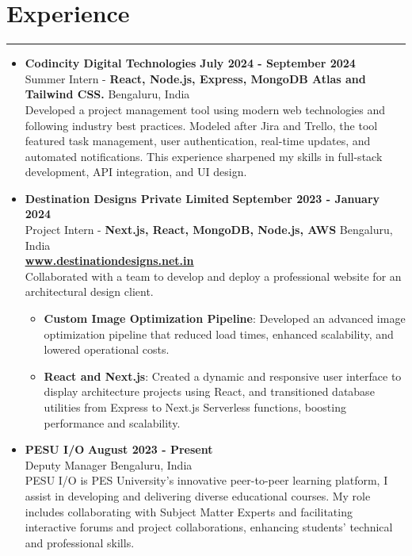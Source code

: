 \documentclass[a4paper,10.5pt]{article}
\begin{document}
\section*{Experience}
\vspace{-.3em}
\hrule
\vspace{0.4em}
\begin{itemize}
    \item \textbf{Codincity Digital Technologies} \hfill \textbf{July 2024 - September 2024} \vspace{0.3em} \\ 
    Summer Intern - \textbf{React, Node.js, Express, MongoDB Atlas and Tailwind CSS.} \vspace{0.3em} \hfill Bengaluru, India \\
    Developed a project management tool using modern web technologies and following industry best practices. Modeled after Jira and Trello, the tool featured task management, user authentication, real-time updates, and automated notifications. This experience sharpened my skills in full-stack development, API integration, and UI design.
          
    \item \vspace{0.3em} \textbf{Destination Designs Private Limited} \hfill \textbf{September 2023 - January 2024} \vspace{0.3em} \\
          Project Intern - \textbf{Next.js, React, MongoDB, Node.js, AWS} \hfill Bengaluru, India \\ \textbf{\href{https://www.destinationdesigns.net.in/}
          {\underline{www.destinationdesigns.net.in}}}  \vspace{0.3em} \\ Collaborated with a team to develop and deploy a professional website for an architectural design client. 
	      \begin{itemize}
		      \item \textbf{Custom Image Optimization Pipeline}: Developed an advanced image optimization pipeline that reduced load times, enhanced scalability, and lowered operational costs.
		      \item \textbf{React and Next.js}: Created a dynamic and responsive user interface to display architecture projects using React, and transitioned database utilities from Express to Next.js Serverless functions, boosting performance and scalability.
	      \end{itemize}
    \item \vspace{0.3em} \textbf{PESU I/O} \hfill \textbf{August 2023 - Present} \\ 
    Deputy Manager \hfill Bengaluru, India \vspace{0.3em} \\
    PESU I/O is PES University’s innovative peer-to-peer learning platform, I assist in developing and delivering diverse educational courses. My role includes collaborating with Subject Matter Experts and facilitating interactive forums and project collaborations, enhancing students’ technical and professional skills.

\end{itemize}
\end{document}

